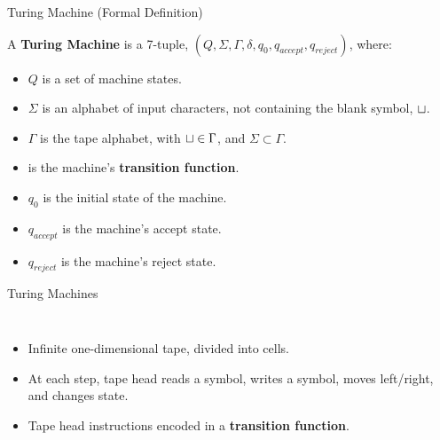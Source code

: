 \documentclass[c]{beamer}
\begin{document}
\begin{frame}{Turing Machine (Formal Definition)}

  \begin{definition}

    A \textbf{Turing Machine} is a 7-tuple, $(Q, \Sigma, \Gamma,
    \delta, q_0, q_{accept}, q_{reject})$, where:

    \begin{itemize}
    \item $Q$ is a set of machine states.
    \item $\Sigma$ is an alphabet of input characters, not containing
      the blank symbol, $\sqcup$.
    \item $\Gamma$ is the tape alphabet, with $\sqcup \in \Gamma$, and
      $\Sigma \subset \Gamma$.
    \item {} is the machine's
      \textbf{transition function}.
    \item $q_0$ is the initial state of the machine.
    \item $q_{accept}$ is the machine's accept state.
    \item $q_{reject}$ is the machine's reject state.
    \end{itemize}
  \end{definition}
  
\end{frame}

\begin{frame}{Turing Machines}
  \begin{columns}[c]

    \begin{itemize}
    \item Infinite one-dimensional tape, divided into cells.
    \item At each step, tape head reads a symbol, writes a symbol,
      moves left/right, and changes state.
    \item Tape head instructions encoded in a \textbf{transition
        function}.
    \end{itemize}
    
  \end{columns}
\end{frame}
\end{document}
